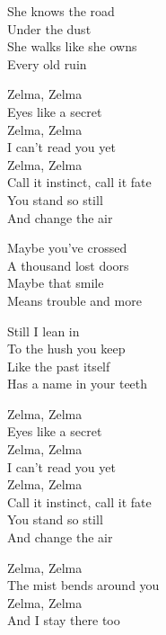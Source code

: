 \begin{lyrics}
She knows the road\\
Under the dust\\
She walks like she owns\\
Every old ruin

Zelma, Zelma\\
Eyes like a secret\\
Zelma, Zelma\\
I can't read you yet\\
Zelma, Zelma\\
Call it instinct, call it fate\\
You stand so still\\
And change the air

Maybe you've crossed\\
A thousand lost doors\\
Maybe that smile\\
Means trouble and more

Still I lean in\\
To the hush you keep\\
Like the past itself\\
Has a name in your teeth

Zelma, Zelma\\
Eyes like a secret\\
Zelma, Zelma\\
I can't read you yet\\
Zelma, Zelma\\
Call it instinct, call it fate\\
You stand so still\\
And change the air

Zelma, Zelma\\
The mist bends around you\\
Zelma, Zelma\\
And I stay there too
\end{lyrics}

